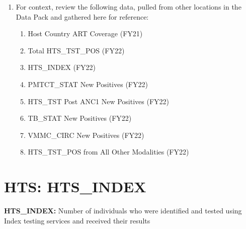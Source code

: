 \documentclass[
  openany]{book}
\begin{document}
\begin{enumerate}
\def\labelenumi{\arabic{enumi}.}
\item
  For context, review the following data, pulled from other locations
  in the Data Pack and gathered here for reference:

  \begin{enumerate}
  \def\labelenumii{\alph{enumii}.}
  \item
    Host Country ART Coverage (FY21)
  \item
    Total HTS\_TST\_POS (FY22)
  \item
    HTS\_INDEX (FY22)
  \item
    PMTCT\_STAT New Positives (FY22)
  \item
    HTS\_TST Post ANC1 New Positives (FY22)
  \item
    TB\_STAT New Positives (FY22)
  \item
    VMMC\_CIRC New Positives (FY22)
  \item
    HTS\_TST\_POS from All Other Modalities (FY22)
  \end{enumerate}
\end{enumerate}

\hypertarget{hts-hts_index}{%
\section{HTS: HTS\_INDEX}\label{hts-hts_index}}

\textbf{HTS\_INDEX:} Number of individuals who were identified and tested
using Index testing services and received their results
\end{document}
